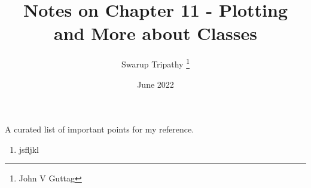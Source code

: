 \documentclass[11pt]{article}
\title{Notes on Chapter 11 - Plotting and More about Classes}
\author{Swarup Tripathy \thanks{John V Guttag}}
\date{June 2022}
\begin{document}
    \maketitle
    A curated list of important points for my reference.\\
    \begin{enumerate}
        \item jsfljkl
    \end{enumerate}
\end{document}
